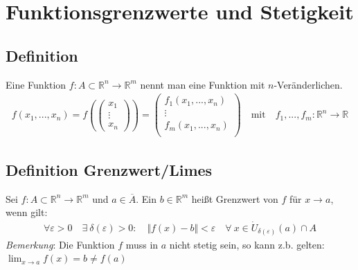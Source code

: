 \documentclass[11pt,a4paper]{book}
\newcommand {\R}	{\mathbb{R}}
\newcommand {\Rn}	{\mathbb{R}^n}
\newcommand {\Rm}	{\mathbb{R}^m}
\newcommand{\1}    	{\mathbbm{1}}
\begin{document}
\section{Funktionsgrenzwerte und Stetigkeit}

\subsection{Definition}
Eine Funktion \(f : A \subset \Rn \rightarrow \Rm \) nennt man eine Funktion mit \(n\)-Veränderlichen.
\begin{align*}
	f(x_1, ..., x_n) = f( \left( \begin{array}{c} x_1 \\ \vdots \\ x_n \end{array} \right) ) = \left( \begin{array}{c}
		f_1(x_1, ..., x_n) \\
		\vdots \\
		f_m(x_1, ..., x_n) \\
	\end{array} \right) \quad \textrm{mit} \quad f_1, ..., f_m : \Rn \rightarrow \R
\end{align*}

\subsection{Definition Grenzwert/Limes}
Sei \(f : A \subset \Rn \rightarrow \Rm \) und \(a \in \overline{A}\). Ein \(b \in \Rm\) heißt Grenzwert von \(f\) für \(x \rightarrow a\), wenn gilt:
\begin{align*}
	\forall \varepsilon > 0 \quad \exists~ \delta(\varepsilon) > 0 : \quad \Vert f(x) - b \Vert < \varepsilon \quad \forall~ x \in \dot{U}_{\delta(\varepsilon)}(a) \cap A
\end{align*}
\textit{Bemerkung}: Die Funktion \(f\) muss in \(a\) nicht stetig sein, so kann z.b. gelten: \\
\( \lim_{x \rightarrow a} f(x) = b \neq f(a) \)
\end{document}
